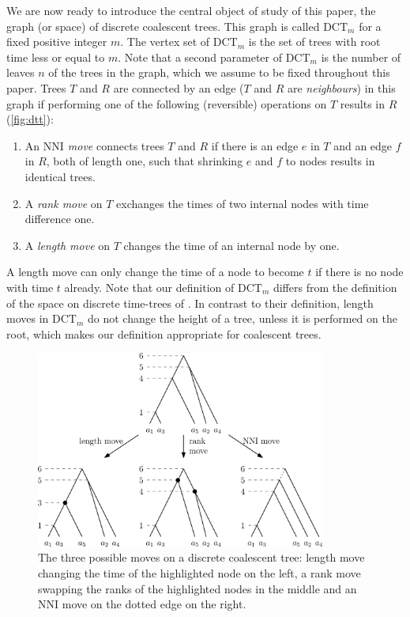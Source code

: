 \documentclass[11pt]{amsart}
\newcommand{\rnni}{\mathrm{RNNI}}
\newcommand{\nni}{\mathrm{NNI}}
\newcommand{\dtt}{\mathrm{DCT}}
\newcommand{\summary}[1]{} %
\begin{document}
\summary{Defining the tree space $\dtt_m$ and $\rnni = \dtt_{n-1}$}
We are now ready to introduce the central object of study of this paper, the graph (or space) of discrete coalescent trees.
This graph is called $\dtt_m$ for a fixed positive integer $m$.
The vertex set of $\dtt_m$ is the set of trees with root time less or equal to $m$.
Note that a second parameter of $\dtt_m$ is the number of leaves $n$ of the trees in the graph, which we assume to be fixed throughout this paper.
Trees $T$ and $R$ are connected by an edge ($T$ and $R$ are \emph{neighbours}) in this graph if performing one of the following (reversible) operations on $T$ results in $R$ (\autoref{fig:dtt}):
\begin{enumerate}
	\item An \emph{$\nni$ move} connects trees $T$ and $R$ if there is an edge $e$ in $T$ and an edge $f$ in $R$, both of length one, such that shrinking $e$ and $f$ to nodes results in identical trees.
	\item A \emph{rank move} on $T$ exchanges the times of two internal nodes with time difference one.
	\item A \emph{length move} on $T$ changes the time of an internal node by one.
\end{enumerate}
A length move can only change the time of a node to become $t$ if there is no node with time $t$ already.
Note that our definition of $\dtt_m$ differs from the definition of the space on discrete time-trees of \textcite{Gavryushkin2018-ol}.
In contrast to their definition, length moves in $\dtt_m$ do not change the height of a tree, unless it is performed on the root, which makes our definition appropriate for coalescent trees.

\begin{figure}[ht]
	\includegraphics[width=0.85\textwidth]{dtt.eps}
	\caption{The three possible moves on a discrete coalescent tree: length move changing the time of the highlighted node on the left, a rank move swapping the ranks of the highlighted nodes in the middle and an $\nni$ move on the dotted edge on the right.}
	\label{fig:dtt}
\end{figure}
\end{document}

